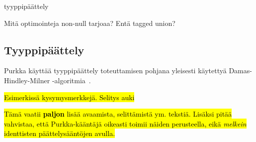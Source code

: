 tyyppipäättely

Mitä optimointeja non-null tarjoaa? Entä tagged union?

\subsection{Tyyppipäättely}

Purkka käyttää tyyppipäättely toteuttamisen pohjana yleisesti käytettyä
Damas-Hindley-Milner -algoritmia~\citep{hindley, milner, damas}.

\FloatBarrier

\hl {Esimerkissä kysymysmerkkejä. Selitys auki}

\hl{Tämä vaatii \textbf{paljon} lisää avaamista, selittämistä ym. tekstiä.
Lisäksi pitää vahvistaa, että Purkka-kääntäjä oikeasti toimii näiden
perusteella, eikä \emph{melkein} identtisten päättelysääntöjen avulla.}

\newcommand{\hmtag}[1]{\tag*{[#1]\hspace*{1cm}}}

